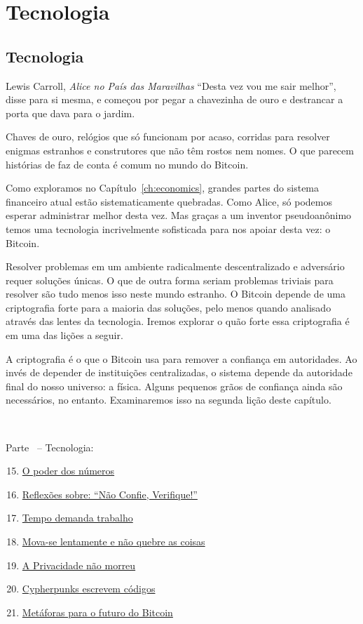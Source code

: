 \part{Tecnologia}
\label{ch:technology}
\chapter*{Tecnologia}

\begin{chapquote}{Lewis Carroll, \textit{Alice no País das Maravilhas}}
\enquote{Desta vez vou me sair melhor}, disse para si mesma, e começou por pegar a chavezinha de ouro e destrancar a porta que dava para o jardim.
\end{chapquote}

Chaves de ouro, relógios que só funcionam por acaso, corridas para resolver enigmas estranhos e construtores que não têm rostos nem nomes. O que parecem histórias de faz de conta é comum no mundo do Bitcoin.

Como exploramos no Capítulo~\ref{ch:economics}, grandes partes do sistema financeiro atual estão sistematicamente quebradas. Como Alice, só podemos esperar administrar melhor desta vez. Mas graças a um inventor pseudoanônimo temos uma tecnologia incrivelmente sofisticada para nos apoiar desta vez: o Bitcoin.

Resolver problemas em um ambiente radicalmente descentralizado e adversário requer soluções únicas. O que de outra forma seriam problemas triviais para resolver são tudo menos isso neste mundo estranho. O Bitcoin depende de uma criptografia forte para a maioria das soluções, pelo menos quando analisado através das lentes da tecnologia. Iremos explorar o quão forte essa criptografia é em uma das lições a seguir.

A criptografia é o que o Bitcoin usa para remover a confiança em autoridades. Ao invés de depender de instituições centralizadas, o sistema depende da autoridade final do nosso universo: a física. Alguns pequenos grãos de confiança ainda são necessários, no entanto. Examinaremos isso na segunda lição deste capítulo.

~

\begin{samepage}
Parte~\ref{ch:technology} -- Tecnologia:

\begin{enumerate}
  \setcounter{enumi}{14}
  \item \hyperref[les:15]{O poder dos números}
  \item \hyperref[les:16]{Reflexões sobre: \enquote{Não Confie, Verifique!}}
  \item \hyperref[les:17]{Tempo demanda trabalho}
  \item \hyperref[les:18]{Mova-se lentamente e não quebre as coisas}
  \item \hyperref[les:19]{A Privacidade não morreu}
  \item \hyperref[les:20]{Cypherpunks escrevem códigos}
  \item \hyperref[les:21]{Metáforas para o futuro do Bitcoin}
\end{enumerate}
\end{samepage}

